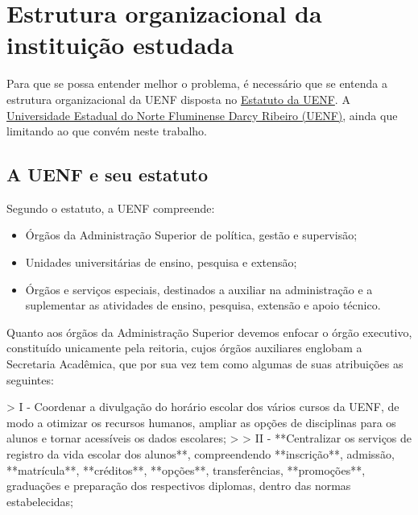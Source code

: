 \chapter{Estrutura organizacional da instituição estudada} %

Para que se possa entender melhor o problema, é necessário que se entenda a estrutura organizacional da UENF disposta no \href{https://www.uenf.br/UENF_ARQUIVOS/Downloads/REITORIA_1360_1101117875.pdf}{Estatuto da UENF}. A \href{https://uenf.br/portal/}{Universidade Estadual do Norte Fluminense Darcy Ribeiro (UENF)}, ainda que limitando ao que convém neste trabalho.

\section{A UENF e seu estatuto} %


    Segundo o estatuto, a UENF compreende:

    \begin{itemize}
        \item Órgãos da Administração Superior de política, gestão e supervisão;
        \item Unidades universitárias de ensino, pesquisa e extensão;
        \item Órgãos e serviços especiais, destinados a auxiliar na administração e a suplementar as atividades de ensino, pesquisa, extensão e apoio técnico.
    \end{itemize}


    Quanto aos órgãos da Administração Superior devemos enfocar o órgão executivo, constituído unicamente pela reitoria, cujos órgãos auxiliares englobam a Secretaria Acadêmica, que por sua vez tem como algumas de suas atribuições as seguintes:

    > I - Coordenar a divulgação do horário escolar dos vários cursos da UENF, de modo a otimizar os recursos humanos, ampliar as opções de disciplinas para os alunos e tornar acessíveis os dados escolares;
    >
    > II - **Centralizar os serviços de registro da vida escolar dos alunos**, compreendendo **inscrição**, admissão, **matrícula**, **créditos**, **opções**, transferências, **promoções**, graduações e preparação dos respectivos diplomas, dentro das normas estabelecidas;

